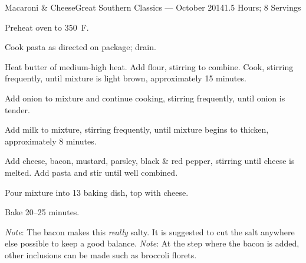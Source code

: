 \documentclass{article}
\begin{document}
\begin{recipe}{Macaroni \& Cheese}{Great Southern Classics --- October 2014}{1.5 Hours; 8 Servings}

   \newstep
   Preheat oven to 350\ \0F.

   Cook pasta as directed on package; drain.

   Heat butter of medium-high heat.  Add flour, stirring to combine.  Cook,
   stirring frequently, until mixture is light brown, approximately 15 minutes.

   Add onion to mixture and continue cooking, stirring frequently, until onion
   is tender.

   Add milk to mixture, stirring frequently, until mixture begins to thicken,
   approximately 8 minutes.


   Add cheese, bacon, mustard, parsley, black \& red pepper, stirring until
   cheese is melted.  Add pasta and stir until well combined.

   Pour mixture into 13 baking dish, top with cheese.

   \newstep
   Bake 20--25 minutes.

   \freeform
   \emph{Note}: The bacon makes this \emph{really} salty.  It is suggested to
   cut the salt anywhere else possible to keep a good balance.
   \newline\newline
   \emph{Note}: At the step where the bacon is added, other inclusions can be
   made such as broccoli florets.

\end{recipe}
\end{document}
